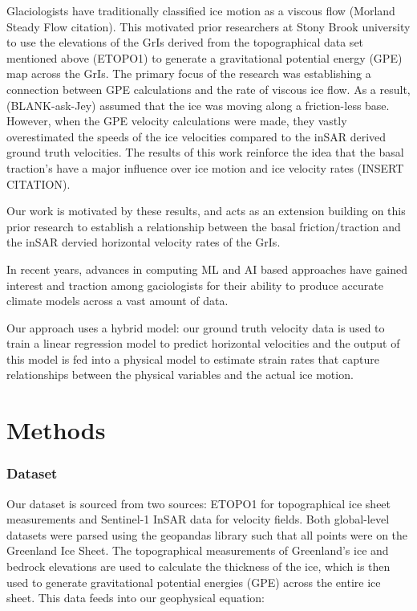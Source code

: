 \documentclass{article}
\begin{document}
Glaciologists have traditionally classified ice motion as a viscous flow (Morland Steady Flow citation). This motivated prior researchers at Stony Brook university to use the elevations of the GrIs derived from the topographical data set mentioned above (ETOPO1) to generate a gravitational potential energy (GPE) map across the GrIs. The primary focus of the research was establishing a connection between GPE calculations and the rate of viscous ice flow. As a result, (BLANK-ask-Jey) assumed that the ice was moving along a friction-less base. However, when the GPE velocity calculations were made, they vastly overestimated the speeds of the ice velocities compared to the inSAR derived ground truth velocities. The results of this work reinforce the idea that the basal traction's have a major influence over ice motion and ice velocity rates (INSERT CITATION). 

Our work is motivated by these results, and acts as an extension building on this prior research to establish a relationship between the basal friction/traction and the inSAR dervied horizontal velocity rates of the GrIs. 

In recent years, advances in computing ML and AI based approaches have gained interest and traction among gaciologists for their ability to produce accurate climate models across a vast amount of data.

Our approach uses a hybrid model: our ground truth velocity data is used to train a linear regression model to predict horizontal velocities and the output of this model is fed into a physical model to estimate strain rates that capture relationships between the physical variables and the actual ice motion.

\section{Methods}

\subsubsection{Dataset}
Our dataset is sourced from two sources: ETOPO1 for topographical ice sheet measurements and Sentinel-1 InSAR data for velocity fields. Both global-level datasets were parsed using the geopandas library such that all points were on the Greenland Ice Sheet. The topographical measurements of Greenland’s ice and bedrock elevations are used to calculate the thickness of the ice, which is then used to generate gravitational potential energies (GPE) across the entire ice sheet. This data feeds into our geophysical equation:
\end{document}
